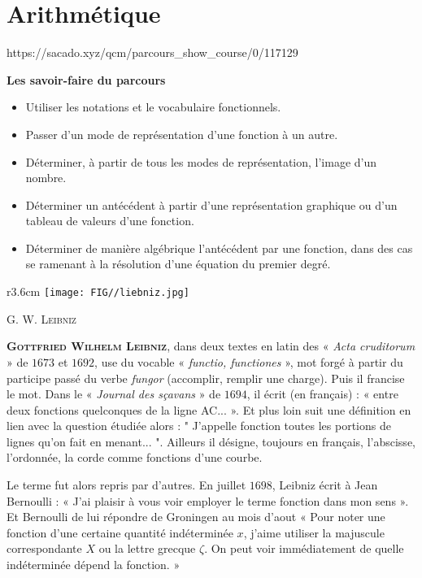 \chapter{Arithmétique}
{https://sacado.xyz/qcm/parcours_show_course/0/117129}
{
 \begin{CpsCol}
\textbf{Les savoir-faire du parcours}
 \begin{itemize}
 \item Utiliser les notations et le vocabulaire fonctionnels.
 \item Passer d'un mode de représentation d'une fonction à un autre.
 \item Déterminer, à partir de tous les modes de représentation, l'image d'un nombre.
 \item Déterminer un antécédent à partir d'une représentation graphique ou d'un tableau de valeurs d'une fonction.
 \item Déterminer de manière algébrique l'antécédent par une fonction, dans des cas se ramenant à la résolution d'une équation du premier degré.
 \end{itemize}
 
 \end{CpsCol}
 
 \begin{His}
 
\begin{wrapfigure}[15]{r}{3.6cm}
\vspace{-7mm}
\texttt{[image: FIG//liebniz.jpg]}
\begin{center}
 G. W. \textsc{Leibniz}
 \end{center} 
\end{wrapfigure}

\textbf{\textsc{Gottfried Wilhelm Leibniz}},  dans  deux  textes  en  latin  des  « \textit{Acta  cruditorum}  »  de  $1673$  et  $1692$,  use  du vocable  «  \textit{functio, functiones} », mot  forgé  à  partir  du  participe  passé  du  verbe \textit{fungor}   (accomplir,   remplir   une  charge).  Puis  il  francise  le  mot.  Dans  le  « \textit{Journal des sçavans} » de $1694$, il écrit (en   français)   :   «   entre   deux  fonctions   quelconques de la ligne AC... ». Et plus  loin  suit  une  définition  en  lien  avec  la  question    étudiée    alors    :  " J'appelle fonction  toutes  les  portions  de  lignes qu'on  fait  en  menant... ".  Ailleurs  il  désigne,  toujours  en  français,  l'abscisse,  l'ordonnée,  la  corde  comme  fonctions  d'une courbe.

\vspace{0.4cm}
Le terme fut alors repris par d'autres. En juillet $1698$,  Leibniz écrit à  Jean Bernoulli :   «   J'ai   plaisir   à   vous   voir   
employer  le  terme  fonction  dans  mon  sens  ».  Et  Bernoulli  de  lui  répondre  de  Groningen  au  mois  d'aout  «  Pour  noter  
une   fonction   d'une   certaine   quantité indéterminée $x$, j'aime  utiliser  la majuscule  correspondante  $X$  ou  la lettre  grecque $\zeta$. On peut voir immédiatement de quelle indéterminée dépend la fonction. » 


\end{His}}
